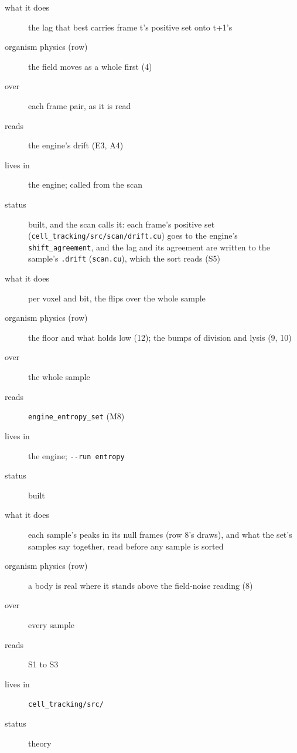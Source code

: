 \begin{description}
\item[{what it does}] the lag that best carries frame t's positive set onto t+1's
\item[{organism physics (row)}] the field moves as a whole first (4)
\item[{over}] each frame pair, as it is read
\item[{reads}] the engine's drift (E3, A4)
\item[{lives in}] the engine; called from the scan
\item[{status}] built, and the scan calls it: each frame's positive set (\texttt{cell\_\allowbreak{}tracking/\allowbreak{}src/\allowbreak{}scan/\allowbreak{}drift.\allowbreak{}cu}) goes to the engine's \texttt{shift\_\allowbreak{}agreement}, and the lag and its agreement are written to the sample's \texttt{.\allowbreak{}drift} (\texttt{scan.\allowbreak{}cu}), which the sort reads (S5)
\end{description}

\begin{description}
\item[{what it does}] per voxel and bit, the flips over the whole sample
\item[{organism physics (row)}] the floor and what holds low (12); the bumps of division and lysis (9, 10)
\item[{over}] the whole sample
\item[{reads}] \texttt{engine\_\allowbreak{}entropy\_\allowbreak{}set} (M8)
\item[{lives in}] the engine; \texttt{-\allowbreak{}-\allowbreak{}run entropy}
\item[{status}] built
\end{description}

\begin{description}
\item[{what it does}] each sample's peaks in its null frames (row 8's draws), and what the set's samples say together, read before any sample is sorted
\item[{organism physics (row)}] a body is real where it stands above the field-noise reading (8)
\item[{over}] every sample
\item[{reads}] S1 to S3
\item[{lives in}] \texttt{cell\_\allowbreak{}tracking/\allowbreak{}src/\allowbreak{}}
\item[{status}] theory
\end{description}

